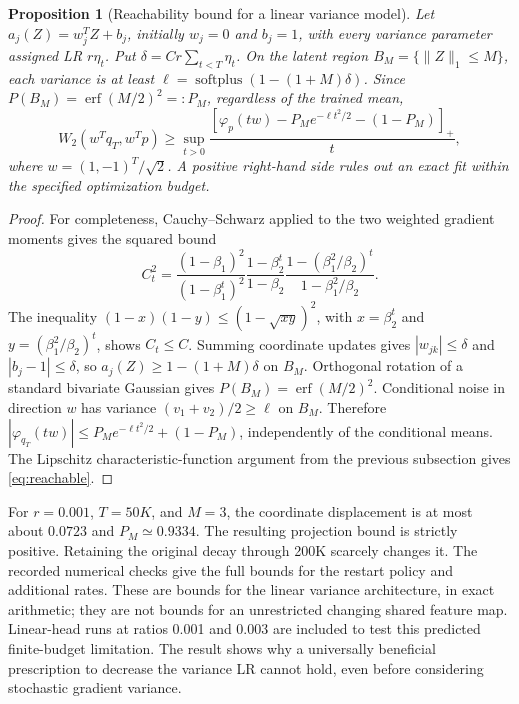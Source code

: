 \documentclass[11pt,a4paper]{article}
\newtheorem{proposition}{Proposition}[section]
\begin{document}
\begin{proposition}[Reachability bound for a linear variance model]
Let $a_j(Z)=w_j^TZ+b_j$, initially $w_j=0$ and $b_j=1$, with every variance
parameter assigned LR $r\eta_t$. Put $\delta=C r\sum_{t<T}\eta_t$.
On the latent region $B_M=\{\|Z\|_1\le M\}$, each variance is at least
$\ell=\operatorname{softplus}(1-(1+M)\delta)$. Since
$P(B_M)=\operatorname{erf}(M/2)^2=:P_M$, regardless of the trained mean,
\begin{equation}
 W_2(w^Tq_T,w^Tp)\ge
 \sup_{t>0}\frac{[\varphi_p(tw)-P_Me^{-\ell t^2/2}-(1-P_M)]_+}{t},
 \label{eq:reachable}
\end{equation}
where $w=(1,-1)^T/\sqrt2$. A positive right-hand side rules out an exact fit
within the specified optimization budget.
\end{proposition}
\begin{proof}
For completeness, Cauchy--Schwarz applied to the two weighted gradient moments
gives the squared bound
\[
 C_t^2=\frac{(1-\beta_1)^2}{(1-\beta_1^t)^2}
 \frac{1-\beta_2^t}{1-\beta_2}
 \frac{1-(\beta_1^2/\beta_2)^t}{1-\beta_1^2/\beta_2}.
\]
The inequality $(1-x)(1-y)\le(1-\sqrt{xy})^2$, with
$x=\beta_2^t$ and $y=(\beta_1^2/\beta_2)^t$, shows $C_t\le C$.
Summing coordinate updates gives $|w_{jk}|\le\delta$ and $|b_j-1|\le\delta$,
so $a_j(Z)\ge1-(1+M)\delta$ on $B_M$. Orthogonal rotation of a standard
bivariate Gaussian gives $P(B_M)=\operatorname{erf}(M/2)^2$.
Conditional noise in direction $w$ has variance $(v_1+v_2)/2\ge\ell$ on
$B_M$. Therefore
$|\varphi_{q_T}(tw)|\le P_Me^{-\ell t^2/2}+(1-P_M)$, independently of
the conditional means. The Lipschitz characteristic-function argument from
the previous subsection gives \eqref{eq:reachable}.
\end{proof}

For $r=0.001$, $T=50K$, and $M=3$, the coordinate displacement is at most
about $0.0723$ and $P_M\simeq0.9334$. The resulting projection bound is
strictly positive. Retaining the original decay through 200K scarcely changes
it. The recorded numerical checks give the full bounds for the restart policy
and additional rates. These are bounds for the linear variance architecture,
in exact arithmetic; they are not bounds for an unrestricted changing shared
feature map. Linear-head runs at ratios 0.001 and 0.003 are included to test
this predicted finite-budget limitation. The result shows why a universally
beneficial prescription to decrease the variance LR cannot hold, even before
considering stochastic gradient variance.
\end{document}
